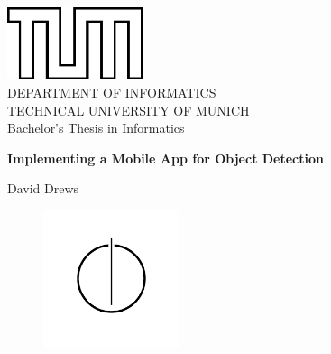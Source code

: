 \documentclass[
			   fontsize=11pt,
               paper=a4,
               bibliography=totoc,
               idxtotoc,
               headsepline,
               footsepline,
               footinclude=false,
               BCOR=12mm,
               DIV=13,
               openany,   %
               oneside    %
               ]
               {scrbook}
\def\doctype{Bachelor's Thesis\xspace}
\def\studyProgram{Informatics}
\def\title{Implementing a Mobile App for Object Detection}
\def\author{David Drews}
\begin{document}
\frontmatter

\def\bcorcor{0.15cm}
\addtolength{\hoffset}{\bcorcor}
\thispagestyle{empty}
\vspace{4cm}
\begin{center}
    \includegraphics[width=4cm]{templateStuff/tumlogo.pdf}\\[5mm]
    \huge DEPARTMENT OF INFORMATICS\\[5mm]
    \large TECHNICAL UNIVERSITY OF MUNICH\\[24mm]

    {\Large \doctype in \studyProgram}\\[20mm]
    {\huge\bf \title\par}
    \vspace{15mm}
    {\LARGE  \author}
    \vspace{10mm}
    \begin{figure}[h!]
        \centering
        \includegraphics[width=4cm]{templateStuff/informat.pdf}
   \end{figure}
\end{center}

\cleardoubleemptypage

\end{document}
